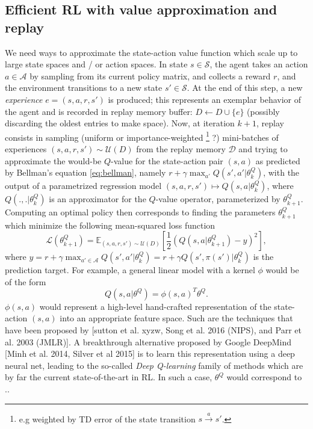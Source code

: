 \documentclass{article} %
\begin{document}
\subsection{Efficient RL with value approximation and replay}
We need ways to approximate the state-action value function
which scale up to large state spaces and / or action spaces.
In state $s \in \mathcal S$, the agent takes an action $a \in \mathcal A$
by sampling from its current policy matrix, and collects a reward $r$,
and the environment transitions to a new state $s' \in \mathcal S$. At the end of
this step, a new \textit{experience} $e = (s,a,r,s')$ is produced; this represents an exemplar
behavior of the agent and is recorded in replay memory buffer:
$D \leftarrow D \cup \{e\}$ (possibly discarding the oldest entries to make space).
Now, at iteration $k+1$, replay consists in sampling (uniform or importance-weighted
\footnote{e.g weighted by TD error of the state transition $s \overset{a}{\rightarrow} s'$.} ?)  mini-batches of experiences
$(s, a, r, s') \sim \mathcal U(D)$ from the replay memory $\mathcal D$ and trying to
approximate
the would-be $Q$-value for the state-action pair $(s,a)$ as predicted by Bellman's equation \eqref{eq:bellman}, namely
$r + \gamma \max_{a'} Q(s', a'|\theta^Q_k)$, with the output of a parametrized regression model $(s,a,r,s')
\mapsto {Q}(s, a|\theta^Q_{k})$, where $Q(.,.|\theta^Q_{k})$ is an approximator for the $Q$-value operator,  parameterized by $\theta^Q_{k+1}$.
Computing an optimal policy then corresponds to finding the parameters $\theta^Q_{k+1}$ which minimize the following mean-squared loss function
\begin{equation}
  \mathcal L(\theta^Q_{k+1})
  = \mathbb E_{(s, a, r, s') \sim \mathcal U(D)}\left[\frac{1}{2}(Q(s, a|\theta^Q_{k+1}) - y)^2\right],
  \label{eq:oracle}
\end{equation}
where
$ y = r + \gamma \max_{a' \in \mathcal A} Q(s', a'|\theta^Q_k) = r + \gamma Q(s', \pi(s')|\theta^Q_k)$ is the prediction target.
For example, a general linear model with a kernel $\phi$ would be of the
form
$${Q}(s, a|\theta^Q) = \phi(s,a)^T\theta^Q.$$
$\phi(s,a)$ would represent a high-level hand-crafted representation of the state-action $(s,a)$ into an appropriate
feature space. Such are the techniques that have been proposed by [sutton et al. xyzw, Song et al. 2016 (NIPS),
  and Parr et al. 2003 (JMLR)].
A breakthrough alternative proposed by Google DeepMind [Minh et al. 2014, Silver et al 2015] is to learn this
representation using a deep neural net, leading to the so-called \textit{Deep Q-learning} family of methods which
are by far the current state-of-the-art in RL. In such a case, $\theta^Q$
would correspond to ..
\end{document}
